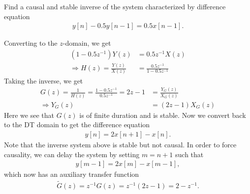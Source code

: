 \documentclass{report}
\begin{document}
\begin{example}
    Find a causal and stable inverse of the system characterized by difference equation 
    \begin{align*}
        y[n] - 0.5y[n-1] = 0.5x[n-1].
    \end{align*}
\end{example}
\begin{solution}
    Converting to the $z$-domain, we get 
    \begin{align*}
        (1-0.5z^{-1})Y(z) &= 0.5z^{-1}X(z) \\
        \Longrightarrow H(z) = \frac{Y(z)}{X(z)} &= \frac{0.5z^{-1}}{1-0.5z^{-1}}
    \end{align*}
    Taking the inverse, we get
    \begin{align*}
        G(z) = \frac{1}{H(z)} = \frac{1-0.5z^{-1}}{0.5z^{-1}} = 2z - 1 &= \frac{Y_G(z)}{X_G(z)} \\
        \Longrightarrow Y_G(z) &= (2z - 1)X_G(z)
    \end{align*}
    Here we see that $G(z)$ is of finite duration and is stable. Now we convert back to the DT domain to get the difference equation 
    \begin{align*}
        y[n] = 2x[n+1] - x[n].
    \end{align*}
    Note that the inverse system above is stable but not causal. In order to force causality, we can delay the system by setting $m=n+1$ such that 
    \begin{align*}
        y[m-1] = 2x[m] - x[m-1],
    \end{align*}
    which now has an auxiliary transfer function 
    \begin{align*}
        \tilde{G}(z) = z^{-1}G(z) = z^{-1}(2z - 1) = 2 - z^{-1}.
    \end{align*}
\end{solution}
\end{document}
